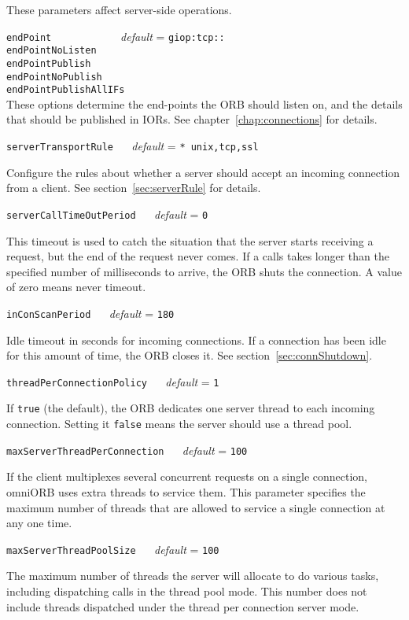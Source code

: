 \documentclass[11pt,twoside,a4paper]{book}
\makeatletter
\newcommand{\code}[1]{\texttt{#1}}
\newcommand{\confopt}[2]
  {\vspace{\baselineskip}\par\noindent\code{#1} ~~ \textit{default} =
   \code{#2}}
\renewcommand{\confopt}[2]
  {\vspace{\baselineskip}\par\noindent\code{#1} ~~ \textit{default} =
   \code{#2}\\[-1ex]\@afterheading}
\makeatother
\begin{document}
These parameters affect server-side operations.


\vspace{\baselineskip}

\noindent
\code{endPoint~~~~~~~~~} ~~ \textit{default} = \code{giop:tcp::}\\
\code{endPointNoListen}\\
\code{endPointPublish}\\
\code{endPointNoPublish}\\
\code{endPointPublishAllIFs}\\[.1ex]

\noindent
These options determine the end-points the ORB should listen on, and
the details that should be published in IORs. See
chapter~\ref{chap:connections} for details.



\confopt{serverTransportRule}{* unix,tcp,ssl}

Configure the rules about whether a server should accept an incoming
connection from a client. See section~\ref{sec:serverRule} for
details.


\confopt{serverCallTimeOutPeriod}{0}

This timeout is used to catch the situation that the server starts
receiving a request, but the end of the request never comes. If a
calls takes longer than the specified number of milliseconds to
arrive, the ORB shuts the connection. A value of zero means never
timeout.


\confopt{inConScanPeriod}{180}

Idle timeout in seconds for incoming connections. If a connection has
been idle for this amount of time, the ORB closes it. See
section~\ref{sec:connShutdown}.


\confopt{threadPerConnectionPolicy}{1}

If \code{true} (the default), the ORB dedicates one server thread to
each incoming connection. Setting it \code{false} means the server
should use a thread pool.


\confopt{maxServerThreadPerConnection}{100}

If the client multiplexes several concurrent requests on a single
connection, omniORB uses extra threads to service them. This parameter
specifies the maximum number of threads that are allowed to service a
single connection at any one time.


\confopt{maxServerThreadPoolSize}{100}

The maximum number of threads the server will allocate to do various
tasks, including dispatching calls in the thread pool mode. This
number does not include threads dispatched under the thread per
connection server mode.
\end{document}
